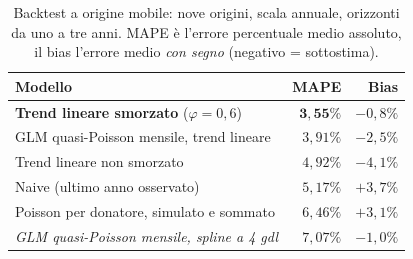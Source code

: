 \begin{table}[ht]
\centering
\caption{Backtest a origine mobile: nove origini, scala annuale, orizzonti
da uno a tre anni. MAPE è l'errore percentuale medio assoluto, il bias l'errore
medio \emph{con segno} (negativo = sottostima).}
\label{tab:fc_backtest}
\begin{tabular}{@{}lrr@{}}
\toprule
\textbf{Modello} & \textbf{MAPE} & \textbf{Bias} \\
\midrule
\textbf{Trend lineare smorzato} ($\varphi = 0{,}6$) & $\mathbf{3{,}55\%}$ & $-0{,}8\%$ \\
GLM quasi-Poisson mensile, trend lineare            & $3{,}91\%$ & $-2{,}5\%$ \\
Trend lineare non smorzato                          & $4{,}92\%$ & $-4{,}1\%$ \\
Naive (ultimo anno osservato)                       & $5{,}17\%$ & $+3{,}7\%$ \\
Poisson per donatore, simulato e sommato            & $6{,}46\%$ & $+3{,}1\%$ \\
\emph{GLM quasi-Poisson mensile, spline a 4 gdl}    & $7{,}07\%$ & $-1{,}0\%$ \\
\bottomrule
\end{tabular}
\end{table}

